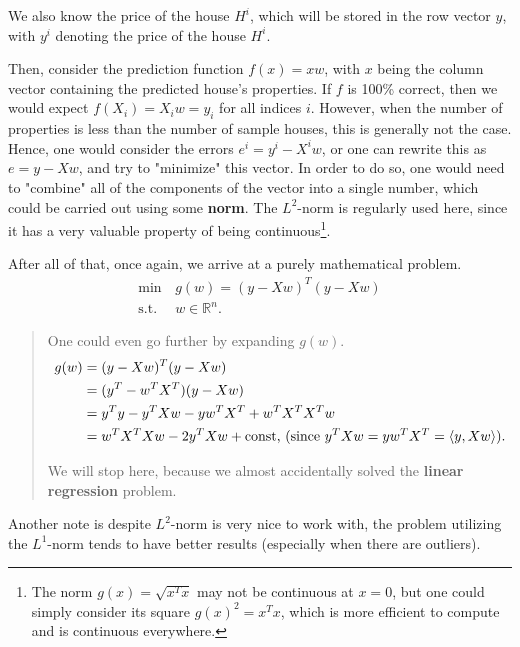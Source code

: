 We also know the price of the house \( H^{i} \), which will be stored in the row
vector \( y \), with \( y^{i} \) denoting the price of the house \( H^{i} \).

Then, consider the prediction function \( f(x) = xw \), with \( x \) being the
column vector containing the predicted house's properties. If \( f \) is
100\% correct, then we would expect \( f(X_{i}) = X_{i}w = y_{i} \) for all
indices \( i \). However, when the number of properties is less than the number
of sample houses, this is generally not the case. Hence, one would consider the
errors \( e^{i} = y^{i} - X^{i}w \), or one can rewrite this as \( e = y - Xw
\), and try to "minimize" this vector. In order to do so, one would need to
"combine" all of the components of the vector into a single number, which could
be carried out using some \textbf{norm}. The \( L^{2} \)-norm is regularly used
here, since it has a very valuable property of being continuous\footnote{The
norm \( g(x) =\sqrt{x^{T}x}  \) may not be continuous at \( x = 0 \), but one
could simply consider its square \( g(x)^2= x^{T}x \), which is more efficient
to compute and is continuous everywhere.}.

After all of that, once again, we arrive at a purely mathematical problem.
\begin{align*}
  \min\, &g(w) = (y-Xw)^{T}(y-Xw)\\
  \text{s.t.}\, &w \in \mathbb{R}^{n}
.\end{align*}

\begin{quote}
  One could even go further by expanding \( g(w) \).
  \begin{align*}
    g(w) &= (y-Xw)^{T}(y-Xw)\\
         &= (y^{T}-w^{T}X^{T})(y-Xw)\\
         &= y^{T}y - y^{T}Xw - yw^{T}X^{T} + w^{T}X^{T}X^{T}w\\
         &= w^{T}X^{T}Xw - 2y^{T}Xw + \text{const, (since \( y^{T}Xw = yw^{T}X^{T} =
         \langle y, Xw \rangle \))} 
  .\end{align*}

  We will stop here, because we almost accidentally solved the \textbf{linear
  regression} problem.
\end{quote}

Another note is despite \( L^2 \)-norm is very nice to work with, the problem
utilizing the \( L^{1} \)-norm tends to have better results (especially when
there are outliers).

